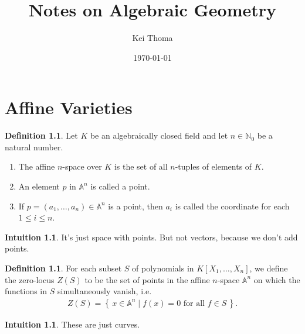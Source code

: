 \documentclass[11pt]{book}
\title{Notes on Algebraic Geometry}
\author{Kei Thoma}
\date{\today}
\theoremstyle{definition}
\newtheorem{definition}[theorem]{Definition}
\newtheorem{intuition}[theorem]{Intuition}
\numberwithin{equation}{section}
\newcommand{\makeset}[2]{\left\{\, #1 \mathrel{\mid} #2 \,\right\}}
\begin{document}
\maketitle
\tableofcontents

\cite{hartshorne1977}
\newpage
\chapter{Affine Varieties}
\begin{defbox}
    \begin{definition}
        Let \(K\) be an algebraically closed field and let \(n \in \mathbb{N}_0\) be a natural number.
        \begin{enumerate}
            \item The affine \(n\)-space over \(K\) is the set of all \(n\)-tuples of elements of \(K\).
            \item An element \(p\) in \(\mathbb{A}^n\) is called a point.
            \item If \(p = (a_1, \ldots, a_n) \in \mathbb{A}^n\) is a point, then \(a_i\) is called the coordinate for each \(1 \leq i \leq n\).
        \end{enumerate}
    \end{definition}
\end{defbox}

\begin{intbox}
\begin{intuition}
It's just space with points. But not vectors, because we don't add points.
\end{intuition}
\end{intbox}

\begin{defbox}
    \begin{definition}
        For each subset \(S\) of polynomials in \(K[X_1, \ldots, X_n]\), we define the zero-locus \(Z(S)\) to be the set of points in the affine \(n\)-space \(\mathbb{A}^n\) on which the functions in \(S\) simultaneously vanish, i.e.
        \begin{align*}
            Z(S) = \makeset{x \in \mathbb{A}^n}{f(x) = 0 \text{ for all } f \in S} \text{.}
        \end{align*}
    \end{definition}
\end{defbox}

\begin{intbox}
    \begin{intuition}
        These are just curves.
    \end{intuition}
\end{intbox}
\end{document}
